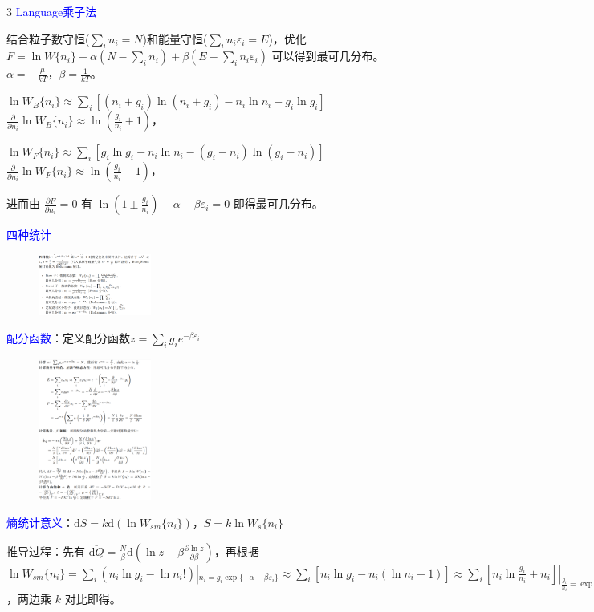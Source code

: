 \documentclass[a4paper,8pt]{extarticle} %
\newcommand{\bluetext}[1]{\textcolor{blue}{#1}}
\begin{document}
\begin{multicols}{3}
\bluetext{Language乘子法}

结合粒子数守恒($\sum_i n_i = N$)和能量守恒($\sum_i n_i\varepsilon_i = E$)，优化 $F = \ln W\{n_i\} + \alpha(N-\sum_i n_i) + \beta(E-\sum_i n_i\varepsilon_i)$ 可以得到最可几分布。$\alpha = -\frac{\mu}{kT}$，$\beta = \frac{1}{kT}$。

$\ln W_B\{n_i\} \approx \sum_i [(n_i + g_i)\ln(n_i + g_i) - n_i \ln n_i - g_i \ln g_i]$
$\frac{\partial}{\partial n_i}\ln W_B\{n_i\} \approx \ln(\frac{g_i}{n_i} + 1)$，

$\ln W_F\{n_i\} \approx \sum_i [g_i \ln g_i - n_i \ln n_i - (g_i - n_i)\ln(g_i - n_i)]$
$\frac{\partial}{\partial n_i}\ln W_F\{n_i\} \approx \ln(\frac{g_i}{n_i} - 1)$，

进而由 $\frac{\partial F}{\partial n_i} = 0$ 有 $\ln(1 \pm \frac{g_i}{n_i}) - \alpha - \beta\varepsilon_i = 0$ 即得最可几分布。

\bluetext{四种统计}

\begin{figure}[H]
    \vspace{-0.3cm}
    \centering
    \includegraphics[width=0.33\textwidth]{images/1.png}
    \vspace{-0.6cm}
\end{figure}

\bluetext{配分函数}：定义配分函数$z=\sum_i g_i e^{-\beta\varepsilon_i}$

\begin{figure}[H]
    \vspace{-0.3cm}
    \centering
    \includegraphics[width=0.33\textwidth]{images/2.png}
    \vspace{-0.6cm}
\end{figure}

\bluetext{熵统计意义}：$\mathrm{d}S = k\mathrm{d}(\ln W_{sm}\{n_i\})$，$S = k\ln W_s\{n_i\}$

推导过程：先有 $\overline{\mathrm{d}Q} = \frac{N}{\beta}\mathrm{d}(\ln z - \beta\frac{\partial\ln z}{\partial\beta})$，再根据 $\ln W_{sm}\{n_i\} = \sum_i (n_i\ln g_i - \ln n_i!)|_{n_i=g_i\exp\{-\alpha-\beta\varepsilon_i\}} \approx \sum_i [n_i\ln g_i - n_i(\ln n_i-1)] \approx \sum_i [n_i\ln \frac{g_i}{n_i} + n_i]|_{\frac{g_i}{n_i}=\exp\{\alpha+\beta\varepsilon_i\}} = \sum_i n_i(\alpha + \beta\varepsilon_i + 1) = N\alpha + \beta E + N = N(\ln z - \beta\frac{\partial\ln z}{\partial\beta}) + N(1-\ln N)$，两边乘 $k$ 对比即得。
\end{multicols}
\end{document}
